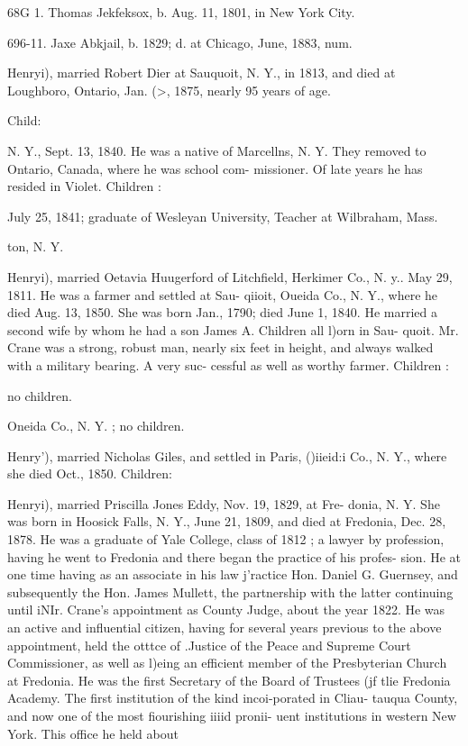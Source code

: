 \documentclass{book}
\begin{document}
68G 1. Thomas Jekfeksox, b. Aug. 11, 1801, in New York City. 










696-11. Jaxe Abkjail, b. 1829; d. at Chicago, June, 1883, num. 



Henryi), married Robert Dier at Sauquoit, N. Y., in 1813, and 
died at Loughboro, Ontario, Jan. (>, 1875, nearly 95 years of age. 

Child: 


N. Y., Sept. 13, 1840. He was a native of Marcellns, N. Y. 
They removed to Ontario, Canada, where he was school com- 
missioner. Of late years he has resided in Violet. Children : 


July 25, 1841; graduate of Wesleyan University, 
Teacher at Wilbraham, Mass. 


ton, N. Y. 









Henryi), married Oetavia Huugerford of Litchfield, Herkimer 
Co., N. y.. May 29, 1811. He was a farmer and settled at Sau- 
qiioit, Oueida Co., N. Y., where he died Aug. 13, 1850. She 
was born Jan., 1790; died June 1, 1840. He married a second 
wife by whom he had a son James A. Children all l)orn in Sau- 
quoit. Mr. Crane was a strong, robust man, nearly six feet in 
height, and always walked with a military bearing. A very suc- 
cessful as well as worthy farmer. Children : 





no children. 

Oneida Co., N. Y. ; no children. 

Henry'), married Nicholas Giles, and settled in Paris, ()iieid:i 
Co., N. Y., where she died Oct., 1850. Children: 





Henryi), married Priscilla Jones Eddy, Nov. 19, 1829, at Fre- 
donia, N. Y. She was born in Hoosick Falls, N. Y., June 21, 
1809, and died at Fredonia, Dec. 28, 1878. He was a graduate 
of Yale College, class of 1812 ; a lawyer by profession, having 
he went to Fredonia and there began the practice of his profes- 
sion. He at one time having as an associate in his law j'ractice 
Hon. Daniel G. Guernsey, and subsequently the Hon. James 
Mullett, the partnership with the latter continuing until iNIr. 
Crane's appointment as County Judge, about the year 1822. He 
was an active and influential citizen, having for several years 
previous to the above appointment, held the otttce of .Justice of 
the Peace and Supreme Court Commissioner, as well as l)eing an 
efficient member of the Presbyterian Church at Fredonia. He 
was the first Secretary of the Board of Trustees (jf tlie Fredonia 
Academy. The first institution of the kind incoi-porated in Cliau- 
tauqua County, and now one of the most fiourishing iiiid pronii- 
uent institutions in western New York. This office he held about 
\end{document}

